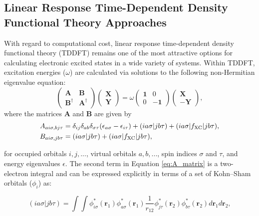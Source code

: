 \documentclass{article}
\begin{document}
\subsection{Linear Response Time-Dependent Density Functional Theory Approaches}
With regard to computational cost, linear response time-dependent density functional theory (TDDFT) remains one of the most attractive options for calculating electronic excited states in a wide variety of systems. Within TDDFT, excitation energies ($\omega$) are calculated via solutions to the following non-Hermitian eigenvalue equation:
\begin{equation}
\label{eq:tddft_eigenvalue_equation}
\begin{pmatrix}
\mathbf{A} & \mathbf{B} \\
\mathbf{B^{\dagger}} & \mathbf{A^{\dagger}} 
\end{pmatrix} 
\begin{pmatrix}
\mathbf{X}\\
\mathbf{Y}
\end{pmatrix}
= \omega
\begin{pmatrix}
\mathbf{1} & 0 \\
0 & -\mathbf{1}
\end{pmatrix}
\begin{pmatrix}
\mathbf{X} \\
\mathbf{-Y}
\end{pmatrix},
\end{equation}
where the matrices $\mathbf{A}$ and $\mathbf{B}$ are given by
\begin{align}
\label{eq:A_matrix}
A_{ai\sigma,bj\tau} &=  \delta_{ij} \delta_{ab} \delta_{\sigma\tau}(\epsilon_{a\sigma} - \epsilon_{i\tau}) + (ia\sigma|jb\tau) + (ia\sigma|f_{\rm XC}|jb\tau), \\
\label{eq:B_matrix}
B_{ai\sigma,jb\tau} &= (ia\sigma|jb\tau) + (ia\sigma|f_{\rm XC}|jb\tau),
\end{align}

for occupied orbitals $i,j,...$, virtual orbitals $a,b,...$, spin indices $\sigma$ and $\tau$, and energy eigenvalues $\epsilon$. The second term in Equation \ref{eq:A_matrix} is a two-electron integral and can be expressed explicitly in terms of a set of Kohn--Sham orbitals ($\phi_i$) as:

\begin{equation}
(ia\sigma|jb\tau) = \int \int \phi^*_{i\sigma}(\mathbf{r}_1)  \phi^*_{a\sigma}(\mathbf{r}_1) \frac{1}{r_{12}} \phi^*_{j\tau}(\mathbf{r}_2) \phi^*_{b\tau}(\mathbf{r}_2) d\mathbf{r}_1 d\mathbf{r}_2,
\end{equation}
\end{document}
